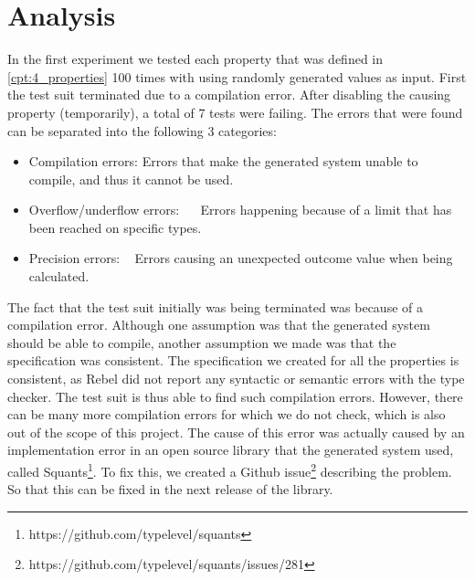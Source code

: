\section{Analysis}
In the first experiment we tested each property that was defined in \autoref{cpt:4_properties} 100 times with using randomly generated values as input. First the test suit terminated due to a compilation error. After disabling the causing property (temporarily), a total of 7 tests were failing. The errors that were found can be separated into the following 3 categories:
\begin{itemize}
\item Compilation errors: Errors that make the generated system unable to compile, and thus it cannot be used.
\item Overflow/underflow errors:~ ~ Errors happening because of a limit that has been reached on specific types.
\item Precision errors: ~ Errors causing an unexpected outcome value when being calculated.
\end{itemize}
The fact that the test suit initially was being terminated was because of a compilation error. Although one assumption was that the generated system should be able to compile, another assumption we made was that the specification was consistent. The specification we created for all the properties is consistent, as Rebel did not report any syntactic or semantic errors with the type checker. The test suit is thus able to find such compilation errors. However, there can be many more compilation errors for which we do not check, which is also out of the scope of this project. The cause of this error was actually caused by an implementation error in an open source library that the generated system used, called Squants\footnote{https://github.com/typelevel/squants}. To fix this, we created a Github issue\footnote{https://github.com/typelevel/squants/issues/281} describing the problem. So that this can be fixed in the next release of the library.\\
